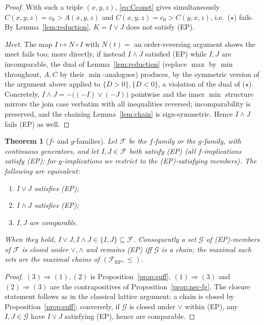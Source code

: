 \documentclass{amsart}
\theoremstyle{plain}
\newtheorem{theorem}{Theorem}
\theoremstyle{definition}
\newcommand{\Fcal}{\mathcal{F}}
\begin{document}
\begin{proof}
With such a triple $(x,y,z)$, \eqref{eq:Cconst} gives simultaneously
$C(x,y,z)=c_0>A(x,y,z)$ and $C(x,y,z)=c_0>C(y,x,z)$, i.e.\ ($\star$) fails.  By
Lemma~\ref{lem:reduction}, $K=I\vee J$ does not satisfy (EP).

\emph{Meet.}  The map $I\mapsto N\circ I$ with $N(t)=$ an order-reversing argument shows
the meet fails too; more directly, if instead $I\wedge J$ satisfied (EP) while $I,J$ are
incomparable, the dual of Lemma~\ref{lem:reduction} (replace $\max$ by $\min$ throughout,
$A,C$ by their $\min$-analogues) produces, by the symmetric version of the argument above
applied to $\{D>0\},\{D<0\}$, a violation of the dual of ($\star$).  Concretely, $I\wedge
J=-\bigl((-I)\vee(-J)\bigr)$ pointwise and the inner $\min$ structure mirrors the join
case verbatim with all inequalities reversed; incomparability is preserved, and the
chaining Lemma~\ref{lem:chain} is sign-symmetric.  Hence $I\wedge J$ fails (EP) as well.
\end{proof}

\begin{theorem}[$f$- and $g$-families]\label{thm:fg}
Let $\Fcal$ be the $f$-family or the $g$-family, with continuous generators, and let
$I,J\in\Fcal$ both satisfy \textup{(EP)} (all $f$-implications satisfy \textup{(EP)};
for $g$-implications we restrict to the \textup{(EP)}-satisfying members).  The following
are equivalent:
\begin{enumerate}
\item $I\vee J$ satisfies \textup{(EP)};
\item $I\wedge J$ satisfies \textup{(EP)};
\item $I,J$ are comparable.
\end{enumerate}
When they hold, $I\vee J,I\wedge J\in\{I,J\}\subseteq\Fcal$.  Consequently a set
$\mathcal G$ of \textup{(EP)}-members of $\Fcal$ is closed under $\vee,\wedge$ and remains
\textup{(EP)} iff $\mathcal G$ is a \emph{chain}; the maximal such sets are the maximal
chains of $(\Fcal_{\mathrm{EP}},\le)$.
\end{theorem}

\begin{proof}
$(3)\Rightarrow(1),(2)$ is Proposition~\ref{prop:suff}.  $(1)\Rightarrow(3)$ and
$(2)\Rightarrow(3)$ are the contrapositives of Proposition~\ref{prop:nec-fg}.  The closure
statement follows as in the classical lattice argument: a chain is closed by
Proposition~\ref{prop:suff}; conversely, if $\mathcal G$ is closed under $\vee$ within
(EP), any $I,J\in\mathcal G$ have $I\vee J$ satisfying (EP), hence are comparable.
\end{proof}
\end{document}
